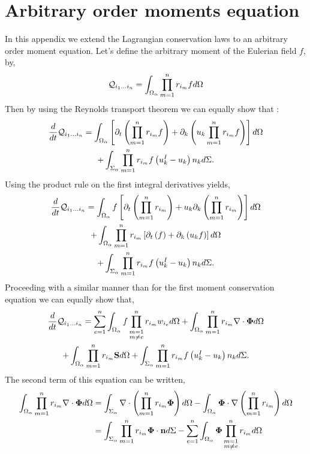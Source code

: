 
\section{Arbitrary order moments equation}
\label{ap:Moments_equations}
In this appendix we extend the Lagrangian conservation laws to an arbitrary order moment equation. 
Let's define the arbitrary moment of the Eulerian field $f$, by, 
\begin{equation*}
    \mathcal{Q}_{i_1\ldots i_n}
    = \int_{\Omega_\alpha} 
    \prod_{m=1}^{n} r_{i_m} f d\Omega
\end{equation*}
Then by using the Reynolds transport theorem we can equally show that :
\begin{multline*}
    \frac{d}{d t} {\mathcal{Q}_{i_1\ldots i_n}}
    =\int_{\Omega_\alpha} \left[ \partial_t \left(\prod_{m=1}^{n} r_{i_m}f\right) 
    + \partial_k \left(u_k \prod_{m=1}^{n} r_{i_m}f\right) \right]d\Omega\\
    +\int_{\Sigma_\alpha} \prod_{m=1}^{n} r_{i_m} f \left(u^I_k - u_k\right) n_k d\Sigma.
\end{multline*}
Using the product rule on the first integral derivatives yields, 
\begin{multline*}
    \frac{d}{d t} {\mathcal{Q}_{i_1\ldots i_n}}
    =\int_{\Omega_\alpha} f \left[ \partial_t \left(\prod_{m=1}^{n} r_{i_m}\right) 
    + u_k \partial_k \left( \prod_{m=1}^{n} r_{i_m}\right) \right]d\Omega\\
    +\int_{\Omega_\alpha} \prod_{m=1}^{n} r_{i_m} \left[ \partial_t \left(f\right) 
    +  \partial_k \left(u_k f \right) \right]d\Omega\\
    +\int_{\Sigma_\alpha} \prod_{m=1}^{n} r_{i_m} f \left(u^I_k - u_k\right) n_k d\Sigma.
\end{multline*}
Proceeding with a similar manner than for the first moment conservation equation we can equally show that, 
\begin{multline*}
    \frac{d}{d t} {\mathcal{Q}_{i_1\ldots i_n}}
    = \sum_{e=1}^{n} \int_{\Omega_\alpha} f  \prod^{n}_{\substack{ m=1 \\   m \neq e}} r_{i_m} w_{i_e}d\Omega
    +\int_{\Omega_\alpha} \prod_{m=1}^{n} r_{i_m} \mathbf{\nabla}\cdot\mathbf{\Phi} d\Omega\\
    + \int_{\Omega_\alpha} \prod_{m=1}^{n} r_{i_m} \textbf{S} d\Omega
    +\int_{\Sigma_\alpha} \prod_{m=1}^{n} r_{i_m} f \left(u^I_k - u_k\right) n_k d\Sigma.
\end{multline*}
The second term of this equation can be written,
\begin{align*}
    \int_{\Omega_\alpha} \prod_{m=1}^{n} r_{i_m} \mathbf{\nabla}\cdot\mathbf{\Phi} d\Omega
    &= \int_{\Sigma_\alpha} \mathbf{\nabla}\cdot \left(\prod_{m=1}^{n} r_{i_m} \mathbf{\Phi} \right)d\Omega
    - \int_{\Omega_\alpha} \mathbf{\Phi} \cdot \mathbf{\nabla} \left(\prod_{m=1}^{n} r_{i_m} \right)d\Omega\\
    &= \int_{\Sigma_\alpha} \prod_{m=1}^{n} r_{i_m} \mathbf{\Phi} \cdot \textbf{n}d\Sigma
    -\sum_{e=1}^{n} \int_{\Omega_\alpha} \mathbf{\Phi}  \prod^{n}_{\substack{ m=1 \\m \neq e}} r_{i_m}  d\Omega
\end{align*}
